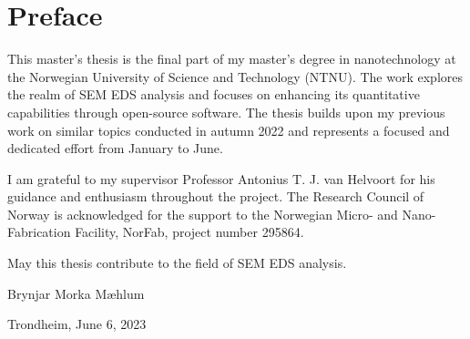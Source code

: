 \chapter*{Preface}
\label{ch:Preface}

This master's thesis is the final part of my master's degree in nanotechnology at the Norwegian University of Science and Technology (NTNU).
The work explores the realm of SEM EDS analysis and focuses on enhancing its quantitative capabilities through open-source software.
The thesis builds upon my previous work on similar topics conducted in autumn 2022 and represents a focused and dedicated effort from January to June. %

I am grateful to my supervisor Professor Antonius T. J. van Helvoort for his guidance and enthusiasm throughout the project.
The Research Council of Norway is acknowledged for the support to the Norwegian Micro- and Nano-Fabrication Facility, NorFab, project number 295864.

May this thesis contribute to the field of SEM EDS analysis.



\vspace{2cm}

Brynjar Morka Mæhlum

Trondheim, June 6, 2023